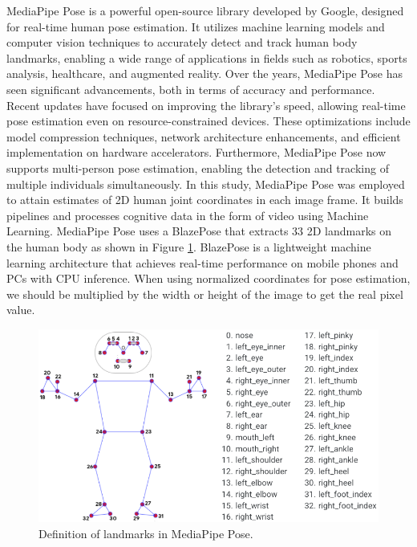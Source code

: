 MediaPipe Pose is a powerful open-source library developed by Google, designed for real-time human pose estimation. It utilizes machine learning models and computer vision techniques to accurately detect and track human body landmarks, enabling a wide range of applications in fields such as robotics, sports analysis, healthcare, and augmented reality. 
Over the years, MediaPipe Pose has seen significant advancements, both in terms of accuracy and performance. Recent updates have focused on improving the library's speed, allowing real-time pose estimation even on resource-constrained devices. These optimizations include model compression techniques, network architecture enhancements, and efficient implementation on hardware accelerators. Furthermore, MediaPipe Pose now supports multi-person pose estimation, enabling the detection and tracking of multiple individuals simultaneously.
In this study, MediaPipe Pose was employed to attain estimates of 2D human joint coordinates in each image frame. It builds pipelines and processes cognitive data in the form of video using Machine Learning. MediaPipe Pose uses a BlazePose that extracts 33 2D landmarks on the human body as shown in Figure \ref{fig:mediapipe-landmark}. BlazePose is a lightweight machine learning architecture that achieves real-time performance on mobile phones and PCs with CPU inference.
When using normalized coordinates for pose estimation, we should be multiplied by the width or height of the image to get the real pixel value.

\begin{figure}[ht]
  \centering
  \includegraphics[scale=0.4]{gambar/mediapipe_landmark.png}
  \caption{Definition of landmarks in MediaPipe Pose.}
  \label{fig:mediapipe-landmark}
\end{figure}

